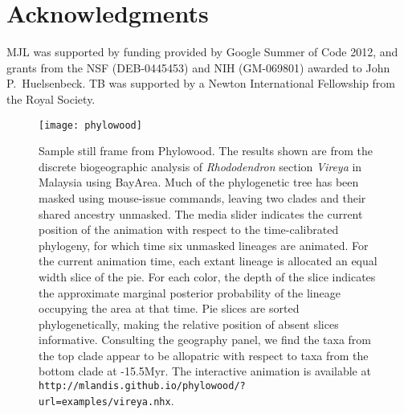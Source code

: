 \documentclass[11pt]{article}
\begin{document}
\section*{Acknowledgments}

MJL was supported by funding provided by Google Summer of Code 2012, and grants from the NSF (DEB-0445453) and NIH (GM-069801) awarded to John P.\ Huelsenbeck.  TB was supported by a Newton International Fellowship from the Royal Society.  



\newpage

\newpage

\begin{figure}
\begin{center}
\texttt{[image: phylowood]}
\caption{
Sample still frame from Phylowood. The results shown are from the discrete biogeographic analysis of {\it Rhododendron} section {\it Vireya} in Malaysia using BayArea. Much of the phylogenetic tree has been masked using mouse-issue commands, leaving two clades and their shared ancestry unmasked. The media slider indicates the current position of the animation with respect to the time-calibrated phylogeny, for which time six unmasked lineages are animated.  For the current animation time, each extant lineage is allocated an equal width slice of the pie. For each color, the depth of the slice indicates the approximate marginal posterior probability of the lineage occupying the area at that time. Pie slices are sorted phylogenetically, making the relative position of absent slices informative. Consulting the geography panel, we find the taxa from the top clade appear to be allopatric with respect to taxa from the bottom clade at -15.5Myr. The interactive animation is available at \texttt{http://mlandis.github.io/phylowood/?url=examples/vireya.nhx}.
}
\label{phylowood}
\end{center}
\end{figure}
\end{document}
